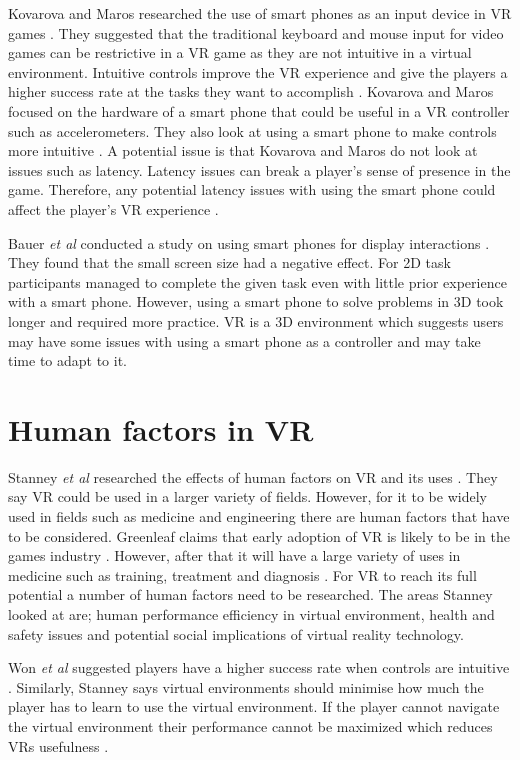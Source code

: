 \documentclass{scrartcl}
\begin{document}
Kovarova and Maros researched the use of smart phones as an input device in VR games \cite{Kovarova}. They suggested that the traditional keyboard and mouse input for video games can be restrictive in a VR game as they are not intuitive in a virtual environment. Intuitive controls improve the VR experience and give the players a higher success rate at the tasks they want to accomplish \cite{Meehan, won2015homuncular}. Kovarova and Maros focused on the hardware of a smart phone that could be useful in a VR controller such as accelerometers. They also look at using a smart phone to make controls more intuitive \cite{Kovarova}.
A potential issue is that Kovarova and Maros do not look at issues such as latency.  Latency issues can break a player's sense of presence in the game. Therefore, any potential latency issues with using the smart phone could affect the player's VR experience \cite{Meehan}.

Bauer \textit{et al} conducted a study on using smart phones for display interactions \cite{Bauer}. They found that the small screen size had a negative effect. For 2D task participants managed to complete the given task even with little prior experience with a smart phone. However, using a smart phone to solve problems in 3D took longer and required more practice. VR is a 3D environment which suggests users may have some issues with using a smart phone as a controller and may take time to adapt to it.

\section{Human factors in VR}
Stanney \textit{et al} researched the effects of human factors on VR and its uses \cite{stanney}.  They say VR could be used in a larger variety of fields. However, for it to be widely used in fields such as medicine and engineering there are human factors that have to be considered. Greenleaf claims that early adoption of VR is likely to be in the games industry \cite{Greenleaf}. However, after that it will have a large variety of uses in medicine such as training, treatment and diagnosis \cite{Greenleaf}.  For VR to reach its full potential a number of human factors need to be researched. The areas Stanney looked at are; human performance efficiency in virtual environment, health and safety issues and potential social implications of virtual reality technology. 

Won \textit{et al} suggested players have a higher success rate when controls are intuitive \cite{won2015homuncular}. 
Similarly, Stanney says virtual environments should minimise how much the player has to learn to use the virtual environment. If the player cannot navigate the virtual environment their performance cannot be maximized which reduces VRs usefulness \cite{stanney}.  
\end{document}
